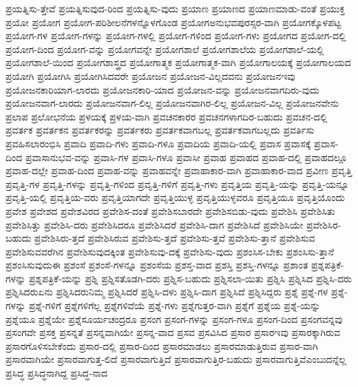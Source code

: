 {ಪ್ರಯತ್ನಿಸು-ತ್ತೇವೆ
ಪ್ರಯತ್ನಿಸುವುದ-ರಿಂದ
ಪ್ರಯತ್ನಿಸು-ವುದು
ಪ್ರಯಾಣ
ಪ್ರಯಾಣದ
ಪ್ರಯಾಣಮಾಡು-ವಂತೆ
ಪ್ರಯುಕ್ತ
ಪ್ರಯೋ
ಪ್ರಯೋಗ
ಪ್ರಯೋಗ-ಪರಿಶೀಲನೆಗಳನ್ನೊಳಗೊಂಡ
ಪ್ರಯೋಗಅನುಭವಪುರಸ್ಸರ-ವಾಗಿ
ಪ್ರಯೋಗಕ್ಕೊಳಪಟ್ಟ
ಪ್ರಯೋಗ-ಗಳ
ಪ್ರಯೋಗ-ಗಳನ್ನು
ಪ್ರಯೋಗ-ಗಳಲ್ಲಿ
ಪ್ರಯೋಗ-ಗಳಿಂದ
ಪ್ರಯೋಗ-ಗಳು
ಪ್ರಯೋಗದ
ಪ್ರಯೋಗ-ದಲ್ಲಿ
ಪ್ರಯೋಗ-ದಿಂದ
ಪ್ರಯೋಗ-ವನ್ನು
ಪ್ರಯೋಗವನ್ನೇ
ಪ್ರಯೋಗಶಾಲೆ
ಪ್ರಯೋಗಶಾಲೆಯ
ಪ್ರಯೋಗಶಾಲೆ-ಯಲ್ಲಿ
ಪ್ರಯೋಗಶಾಲೆ-ಯಿಂದ
ಪ್ರಯೋಗಶಾಸ್ತ್ರದ
ಪ್ರಯೋಗಾತ್ಮಕ
ಪ್ರಯೋಗಾತ್ಮಕ-ವಾಗಿ
ಪ್ರಯೋಗಾಲಯಕ್ಕೆ
ಪ್ರಯೋಗಾಲಯದ
ಪ್ರಯೋಗಿ
ಪ್ರಯೋಗಿಸಿ
ಪ್ರಯೋಗಿಸಿದವರೇ
ಪ್ರಯೋಜನ
ಪ್ರಯೋಜನ-ವಿಲ್ಲದವನು
ಪ್ರಯೋಜನಇವು
ಪ್ರಯೋಜನಕಾರಿಯಾಗ-ಲಾರದು
ಪ್ರಯೋಜನಕಾರಿ-ಯಾದ
ಪ್ರಯೋಜನ-ವನ್ನು
ಪ್ರಯೋಜನವಾಗದಿರು-ವುದು
ಪ್ರಯೋಜನವಾಗ-ಲಾರದು
ಪ್ರಯೋಜನವಾಗ-ಲಿಲ್ಲ
ಪ್ರಯೋಜನವಾಗಿರ-ಲಿಲ್ಲ
ಪ್ರಯೋಜನ-ವಿಲ್ಲ
ಪ್ರಯೋಜನವೇನು
ಪ್ರಲಾಪ
ಪ್ರಲೋಭನೆಯ
ಪ್ರಳಯಕ್ಕೆ
ಪ್ರಳಯ-ವಾಗಿ
ಪ್ರವಚನಕಾರರ
ಪ್ರವಚನಗಳಾಗದಿರ-ಬಹುದು
ಪ್ರವಚನ-ದಲ್ಲಿ
ಪ್ರವರ್ತಕ
ಪ್ರವರ್ತಕನ
ಪ್ರವರ್ತಕರನ್ನು
ಪ್ರವರ್ತಕರು
ಪ್ರವರ್ತಕವಾಗಬಲ್ಲ
ಪ್ರವರ್ತಕವಾಗಬಲ್ಲದು
ಪ್ರವರ್ತಿಸು
ಪ್ರವಹಿಸಲಾರಂಭಿಸಿ
ಪ್ರವಾದಿ
ಪ್ರವಾದಿ-ಗಳು
ಪ್ರವಾದಿ-ಗಳೂ
ಪ್ರವಾದಿಯ
ಪ್ರವಾದಿ-ಯಲ್ಲಿ
ಪ್ರವಾಸ
ಪ್ರವಾಸಕ್ಕೆ
ಪ್ರವಾಸ-ದಿಂದ
ಪ್ರವಾಸಾನುಭವ-ವನ್ನು
ಪ್ರವಾಸಿ-ಗಳ
ಪ್ರವಾಸಿ-ಗಳೂ
ಪ್ರವಾಸೀ
ಪ್ರವಾಹ
ಪ್ರವಾಹದ
ಪ್ರವಾಹ-ದಲ್ಲಿ
ಪ್ರವಾಹದಲ್ಲೂ
ಪ್ರವಾಹ-ದಲ್ಲೇ
ಪ್ರವಾಹ-ದಿಂದ
ಪ್ರವಾಹ-ವನ್ನು
ಪ್ರವಾಹವನ್ನೇ
ಪ್ರವಾಹಾಕಾರ-ವಾಗಿ
ಪ್ರವಾಹಾಕಾರ-ವಾದ
ಪ್ರವೀಣ
ಪ್ರವೃತ್ತಿ
ಪ್ರವೃತ್ತಿ-ಗಳ
ಪ್ರವೃತ್ತಿ-ಗಳನ್ನು
ಪ್ರವೃತ್ತಿ-ಗಳಿಂದ
ಪ್ರವೃತ್ತಿ-ಗಳಿಗೆ
ಪ್ರವೃತ್ತಿ-ಗಳು
ಪ್ರವೃತ್ತಿಯ
ಪ್ರವೃತ್ತಿ-ಯನ್ನು
ಪ್ರವೃತ್ತಿ-ಯನ್ನೂ
ಪ್ರವೃತ್ತಿ-ಯಲ್ಲಿ
ಪ್ರವೃತ್ತಿಯ-ವರು
ಪ್ರವೃತ್ತಿಯಾಗದೇ
ಪ್ರವೃತ್ತಿಯುಳ್ಳ
ಪ್ರವೃತ್ತಿಯುಳ್ಳವರೂ
ಪ್ರವೃತ್ತಿಯೂ
ಪ್ರವೃತ್ತಿಯೊಂದು
ಪ್ರವೇಶ
ಪ್ರವೇಶದ
ಪ್ರವೇಶವಿರದ
ಪ್ರವೇಶಿಸ-ದಂತೆ
ಪ್ರವೇಶಿಸಬಾರದೇ
ಪ್ರವೇಶಿಸಬಿಡು-ವುದು
ಪ್ರವೇಶಿಸಿ
ಪ್ರವೇಶಿಸಿತು
ಪ್ರವೇಶಿಸಿತ್ತು
ಪ್ರವೇಶಿಸಿ-ದರು
ಪ್ರವೇಶಿಸಿದರೂ
ಪ್ರವೇಶಿಸಿದರೆ
ಪ್ರವೇಶಿಸಿ-ದಾಗ
ಪ್ರವೇಶಿಸಿದೆ
ಪ್ರವೇಶಿಸಿಯೇ
ಪ್ರವೇಶಿಸಿರ-ಬಹುದು
ಪ್ರವೇಶಿಸಿರು-ತ್ತದೆ
ಪ್ರವೇಶಿಸಿರುವ
ಪ್ರವೇಶಿಸು-ತ್ತದೆ
ಪ್ರವೇಶಿಸು-ತ್ತವೆ
ಪ್ರವೇಶಿಸು-ತ್ತಾನೆ
ಪ್ರವೇಶಿಸುವ
ಪ್ರವೇಶಿಸುವವರೆಗಿನ
ಪ್ರವೇಶಿಸುವುದಕ್ಕಿಂತ
ಪ್ರವೇಶಿಸುವು-ದಕ್ಕೆ
ಪ್ರವೇಶಿಸು-ವುದು
ಪ್ರಶಂಸಿಸ-ಬೇಕು
ಪ್ರಶಂಸಿಸು-ತ್ತಾನೆ
ಪ್ರಶಂಸಿಸುವುದುಈ
ಪ್ರಶಂಸೆ
ಪ್ರಶಂಸೆ-ಗಳನ್ನೂ
ಪ್ರಶಂಸೆಯ
ಪ್ರಶಸ್ತ-ವಾದ
ಪ್ರಶಸ್ತಿ
ಪ್ರಶಸ್ತಿ-ಗಳನ್ನೂ
ಪ್ರಶಾಂತ
ಪ್ರಶ್ನಪತ್ರಿಕೆ-ಗಳನ್ನು
ಪ್ರಶ್ನಪತ್ರಿಕೆ-ಯನ್ನು
ಪ್ರಶ್ನಿ
ಪ್ರಶ್ನಿಸತೊಡಗಿ-ದರು
ಪ್ರಶ್ನಿಸ-ಬಹುದು
ಪ್ರಶ್ನಿಸಲಾ-ಯಿತು
ಪ್ರಶ್ನಿಸಿ
ಪ್ರಶ್ನಿಸಿದ
ಪ್ರಶ್ನಿಸಿ-ದರು
ಪ್ರಶ್ನಿಸಿದರುಏನು
ಪ್ರಶ್ನಿಸಿದರುನಿಮ್ಮ
ಪ್ರಶ್ನಿಸಿದರೆ
ಪ್ರಶ್ನಿಸಿ-ದಳು
ಪ್ರಶ್ನಿಸಿ-ದಾಗ
ಪ್ರಶ್ನಿಸಿದೆ
ಪ್ರಶ್ನಿಸಿದ್ದರು
ಪ್ರಶ್ನೆ
ಪ್ರಶ್ನೆ-ಗಳ
ಪ್ರಶ್ನೆ-ಗಳನ್ನು
ಪ್ರಶ್ನೆ-ಗಳಿಗೆ
ಪ್ರಶ್ನೆಗಳಿಗೆಲ್ಲ
ಪ್ರಶ್ನೆಗಳಿವೆಯೆ
ಪ್ರಶ್ನೆ-ಗಳು
ಪ್ರಶ್ನೆಗುತ್ತರ-ವಾಗಿ
ಪ್ರಶ್ನೆಗೆ
ಪ್ರಶ್ನೆಯ
ಪ್ರಶ್ನೆ-ಯನ್ನು
ಪ್ರಶ್ನೆಯೂ
ಪ್ರಶ್ನೆಯೇ
ಪ್ರಶ್ನೆಸೂರ್ಯಚಂದ್ರರೂ
ಪ್ರಸಂಗ
ಪ್ರಸಂಗ-ಗಳನ್ನು
ಪ್ರಸಂಗ-ಗಳೂ
ಪ್ರಸಂಗ-ದಿಂದ
ಪ್ರಸಂಗವನ್ನವು
ಪ್ರಸಂಗವೇ
ಪ್ರಸಕ್ತ
ಪ್ರಸನ್ನತೆ
ಪ್ರಸನ್ನವಾಗಿಯೇ
ಪ್ರಸನ್ನ-ವಾದ
ಪ್ರಸವ
ಪ್ರಸವಿಸಿದ
ಪ್ರಸಾರ
ಪ್ರಸಾರಇವು
ಪ್ರಸಾರಕ್ಕಾಗಿರುವ
ಪ್ರಸಾರಗೊಳಿಸಬೇಕೆಂದು
ಪ್ರಸಾರ-ದಲ್ಲಿ
ಪ್ರಸಾರ-ದಿಂದ
ಪ್ರಸಾರಮಾಡಲು
ಪ್ರಸಾರಮಾಡುತ್ತಿರುವ
ಪ್ರಸಾರ-ವಾಗಿ
ಪ್ರಸಾರವಾಗಿಯೇ
ಪ್ರಸಾರವಾಗುತ್ತ-ಲಿದೆ
ಪ್ರಸಾರವಾಗುತ್ತಿದೆ
ಪ್ರಸಾರವಾಗುತ್ತಿರ-ಬಹುದು
ಪ್ರಸಾರವಾಗುತ್ತಿವೆಎಂಬುದನ್ನೆಲ್ಲ
ಪ್ರಸಿದ್ಧ
ಪ್ರಸಿದ್ಧನಾಗಿದ್ದ
ಪ್ರಸಿದ್ಧ-ನಾದ
}
